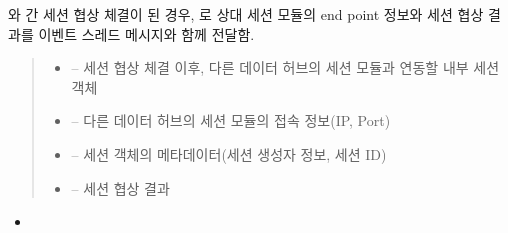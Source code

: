 \documentclass[a4paper,10pt,english]{sphinxmanual}
\begin{document}
\begin{fulllineitems}
\begin{fulllineitems}
\label{\detokenize{_SessionManager:SessionManager._sessionTransmitNegotiationResult}}
\pysigstartsignatures
{}
\pysigstopsignatures
\sphinxAtStartPar
{\hyperref[\detokenize{_SessionRequester:sessionrequester}]{}} 와 {\hyperref[\detokenize{_SessionListener:sessionlistener}]{}} 간 세션 협상 체결이 된 경우,
{\hyperref[\detokenize{_Session:session}]{}} 로 상대 세션 모듈의 end point 정보와 세션 협상 결과를  이벤트 스레드 메시지와 함께 전달함.
\begin{quote}\begin{description}
\begin{itemize}
\item {} 
\sphinxAtStartPar
{} – 세션 협상 체결 이후, 다른 데이터 허브의 세션 모듈과 연동할 내부 세션 객체

\item {} 
\sphinxAtStartPar
{} – 다른 데이터 허브의 세션 모듈의 접속 정보(IP, Port)

\item {} 
\sphinxAtStartPar
{} – 세션 객체의 메타데이터(세션 생성자 정보, 세션 ID)

\item {} 
\sphinxAtStartPar
{} – 세션 협상 결과

\end{itemize}

\end{description}\end{quote}


\nopagebreak

\begin{itemize}
\item {} 
\sphinxAtStartPar
{\hyperref[\detokenize{_Session:Session._smListener}]{}}


\end{itemize}
\end{fulllineitems}
\end{fulllineitems}
\end{document}
